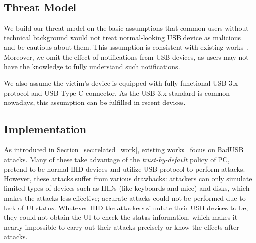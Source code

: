 \section{\tool}
\label{sec:badusb}
\subsection{Threat Model}

We build our threat model on the basic assumptions that common users without
technical background would not treat normal-looking \ac{USB} device as malicious and be cautious about them. This assumption is consistent with existing works~\cite{JFCImpact}. Moreover, we omit the
effect of notifications from \ac{USB} devices, as users may not have the knowledge to fully understand such notifications. 

We also assume the victim's device is equipped with fully functional \ac{USB} 3.x
protocol and \ac{USB} Type-C connector. As the \ac{USB} 3.x standard is
common nowadays, this assumption can be fulfilled in recent
devices.


\subsection{Implementation}

As introduced in Section~\ref{sec:related_work},
existing works~\cite{rubber,badusb,
rubberducky2020,usbbypassing,iseeyou,usbdriver} focus on BadUSB attacks.
Many of these take advantage of the \textit{trust-by-default} policy of PC,
pretend to be normal \ac{HID} devices and utilize \ac{USB} protocol to perform attacks.
However, these attacks suffer from various drawbacks:  attackers can
only simulate limited types of devices such as \acp{HID} (like keyboards and mice)
and disks, which makes the attacks less effective;  accurate attacks
could not be performed due to lack of \ac{UI} status. Whatever \ac{HID} the
attackers simulate their \ac{USB} devices to be, they could not obtain the \ac{UI} to
check the status information, which makes it nearly impossible to carry out
their attacks precisely or know the effects after attacks.

